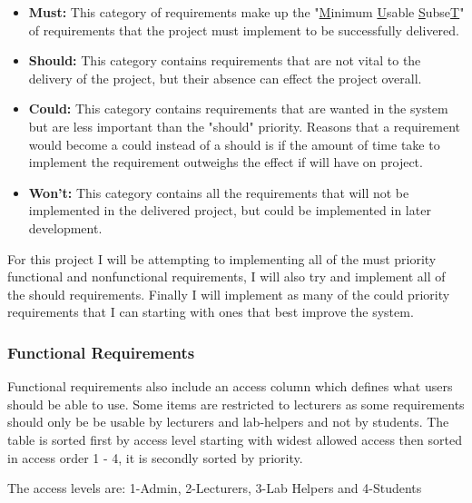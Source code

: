 \documentclass[12pt]{article}  %
\begin{document}
\begin{itemize}

\item \textbf{Must:} This category of requirements make up the "\underline{M}inimum \underline{U}sable \underline{S}ubse\underline{T}" of requirements that the project must implement to be successfully delivered.

\item \textbf{Should:} This category contains requirements that are not vital to the delivery of the project, but their absence can effect the project overall. 

\item \textbf{Could:} This category contains requirements that are wanted in the system but are less important than the "should" priority. Reasons that a requirement would become a could instead of a should is if the amount of time take to implement the requirement outweighs the effect if will have on project.   

\item \textbf{Won't:} This category contains all the requirements that will not be implemented in the delivered project, but could be implemented in later development.
\end{itemize}

\noindent For this project I will be attempting to implementing all of the must priority functional and nonfunctional requirements, I will also try and implement all of the should requirements. Finally I will implement as many of the could priority requirements that I can starting with ones that best improve the system.


\def\arraystretch{1.5}
\subsubsection{Functional Requirements} \label{sec:func}

Functional requirements also include an access column which defines what users should be able to use. Some items are restricted to lecturers as some requirements should only be be usable by lecturers and lab-helpers and not by students. The table is sorted first by access level starting with widest allowed access then sorted in access order 1 - 4, it is secondly sorted by priority.

The access levels are: 1-Admin, 2-Lecturers, 3-Lab Helpers and 4-Students
\end{document}
